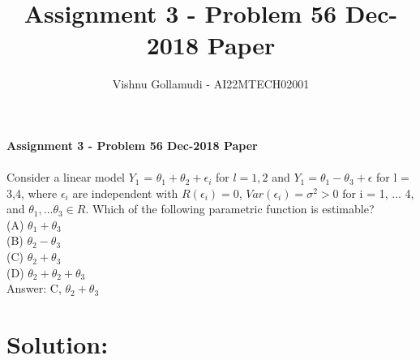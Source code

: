 \documentclass{article}
\title{Assignment 3 - Problem 56 Dec-2018 Paper}
\author{Vishnu Gollamudi - AI22MTECH02001}
\begin{document}
\large \textbf{Assignment 3 - Problem 56 Dec-2018 Paper}\\
\\
Consider a linear model $Y_1$ = $\theta_1 + \theta_2 + \epsilon_i$ for $l = 1,2$ and $Y_1 = \theta_1-\theta_3 + \epsilon$ for l = 3,4, where $\epsilon_i$ are independent with $R(\epsilon_i) = 0$, $Var (\epsilon_i) = \sigma ^{2} > 0$ for i = 1, ... 4, and $\theta_1,... \theta_3 \in R$. Which of the following parametric function is estimable? 
\\
(A) $\theta_1 + \theta_3$ \\
(B) $\theta_2 - \theta_3$  \\
(C) $\theta_2 + \theta_3$ \\
(D) $\theta_2 + \theta_2 + \theta_3$ \\

Answer: C, $\theta_2 + \theta_3$ \\
\section{Solution:} 
\end{document}
